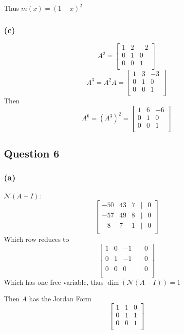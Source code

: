 \documentclass{article}
\begin{document}
Thus \(m(x) = (1 - x)^2\)

\subsubsection*{(c)}
\[
A^2 = \begin{bmatrix}
    1 & 2 & -2 \\
    0 & 1 & 0  \\
    0 & 0 & 1  \\
\end{bmatrix}
\]
\[
A^3 = A^2A = \begin{bmatrix}
    1 & 3 & -3 \\
    0 & 1 & 0  \\
    0 & 0 & 1  \\
\end{bmatrix}
\]
Then
\[
A^6 = (A^3)^2 = \begin{bmatrix}
    1 & 6 & -6 \\
    0 & 1 & 0  \\
    0 & 0 & 1  \\
\end{bmatrix}
\]



\subsection*{Question 6}
\subsubsection*{(a)}
\(\mathcal{N}(A - I)\):
\[
\begin{bmatrix}
    -50 & 43 & 7 & | & 0 \\
    -57 & 49 & 8 & | & 0 \\
    -8 & 7 & 1 & | & 0 \\
\end{bmatrix}
\]
Which row reduces to 
\[
\begin{bmatrix}
    1 & 0 & -1 & | & 0 \\
    0 & 1 & -1 & | & 0 \\
    0 & 0 & 0 & | & 0 \\
\end{bmatrix}
\]
Which has one free variable, thus \(\dim(\mathcal{N}(A-I)) = 1\)

Then \(A\) has the Jordan Form
\[
\begin{bmatrix}
    1 & 1 & 0 \\
    0 & 1 & 1 \\
    0 & 0 & 1 \\
\end{bmatrix}
\]
\end{document}
